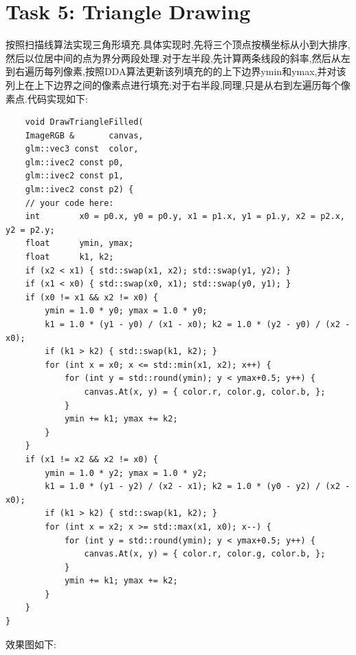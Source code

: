 \documentclass{ctexart}
\begin{document}
\section*{Task 5: Triangle Drawing}
按照扫描线算法实现三角形填充.具体实现时,先将三个顶点按横坐标从小到大排序,然后以位居中间的点为界分两段处理.对于左半段,先计算两条线段的斜率,然后从左到右遍历每列像素,按照DDA算法更新该列填充的的上下边界{\codefont ymin}和{\codefont ymax},并对该列上在上下边界之间的像素点进行填充;对于右半段,同理,只是从右到左遍历每个像素点.代码实现如下:
\begin{lstlisting}
    void DrawTriangleFilled(
    ImageRGB &       canvas,
    glm::vec3 const  color,
    glm::ivec2 const p0,
    glm::ivec2 const p1,
    glm::ivec2 const p2) {
    // your code here:
    int        x0 = p0.x, y0 = p0.y, x1 = p1.x, y1 = p1.y, x2 = p2.x, y2 = p2.y;
    float      ymin, ymax;
    float      k1, k2;
    if (x2 < x1) { std::swap(x1, x2); std::swap(y1, y2); }
    if (x1 < x0) { std::swap(x0, x1); std::swap(y0, y1); }
    if (x0 != x1 && x2 != x0) {
        ymin = 1.0 * y0; ymax = 1.0 * y0;
        k1 = 1.0 * (y1 - y0) / (x1 - x0); k2 = 1.0 * (y2 - y0) / (x2 - x0);
        if (k1 > k2) { std::swap(k1, k2); }
        for (int x = x0; x <= std::min(x1, x2); x++) {
            for (int y = std::round(ymin); y < ymax+0.5; y++) {
                canvas.At(x, y) = { color.r, color.g, color.b, };
            }
            ymin += k1; ymax += k2;
        }
    }
    if (x1 != x2 && x2 != x0) {
        ymin = 1.0 * y2; ymax = 1.0 * y2;
        k1 = 1.0 * (y1 - y2) / (x2 - x1); k2 = 1.0 * (y0 - y2) / (x2 - x0);
        if (k1 > k2) { std::swap(k1, k2); }
        for (int x = x2; x >= std::max(x1, x0); x--) {
            for (int y = std::round(ymin); y < ymax+0.5; y++) {
                canvas.At(x, y) = { color.r, color.g, color.b, };
            }
            ymin += k1; ymax += k2;
        }
    }
}
\end{lstlisting}
效果图如下:
\end{document}
